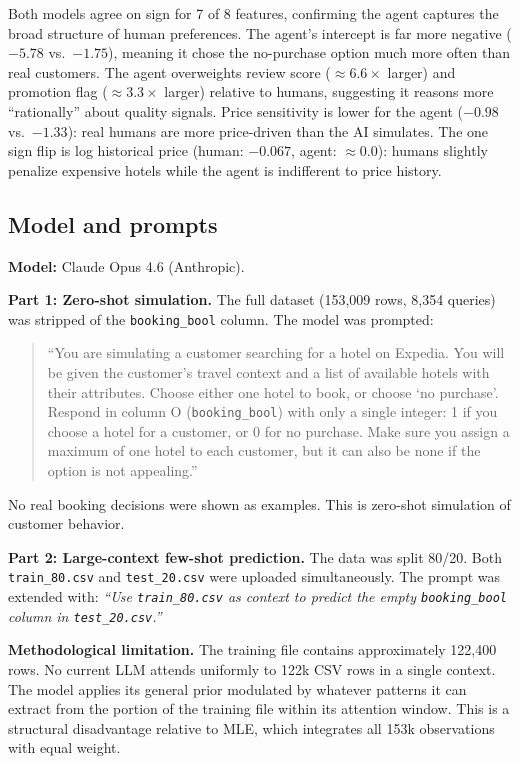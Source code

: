 \documentclass[11pt]{article}
\begin{document}
Both models agree on sign for 7 of 8 features, confirming the agent captures the broad structure of human preferences. The agent's intercept is far more negative ($-5.78$ vs.\ $-1.75$), meaning it chose the no-purchase option much more often than real customers. The agent overweights review score ($\approx 6.6\times$ larger) and promotion flag ($\approx 3.3\times$ larger) relative to humans, suggesting it reasons more ``rationally'' about quality signals. Price sensitivity is lower for the agent ($-0.98$ vs.\ $-1.33$): real humans are more price-driven than the AI simulates. The one sign flip is log historical price (human: $-0.067$, agent: $\approx 0.0$): humans slightly penalize expensive hotels while the agent is indifferent to price history.

\subsection*{Model and prompts}

\textbf{Model:} Claude Opus 4.6 (Anthropic).

\textbf{Part 1: Zero-shot simulation.} The full dataset (153,009 rows, 8,354 queries) was stripped of the \texttt{booking\_bool} column. The model was prompted:

\begin{quote}
``You are simulating a customer searching for a hotel on Expedia. You will be given the customer's travel context and a list of available hotels with their attributes. Choose either one hotel to book, or choose `no purchase'. Respond in column O (\texttt{booking\_bool}) with only a single integer: 1 if you choose a hotel for a customer, or 0 for no purchase. Make sure you assign a maximum of one hotel to each customer, but it can also be none if the option is not appealing.''
\end{quote}

No real booking decisions were shown as examples. This is zero-shot simulation of customer behavior.

\textbf{Part 2: Large-context few-shot prediction.} The data was split 80/20. Both \texttt{train\_80.csv} and \texttt{test\_20.csv} were uploaded simultaneously. The prompt was extended with: \textit{``Use \texttt{train\_80.csv} as context to predict the empty \texttt{booking\_bool} column in \texttt{test\_20.csv}.''}

\textbf{Methodological limitation.} The training file contains approximately 122,400 rows. No current LLM attends uniformly to 122k CSV rows in a single context. The model applies its general prior modulated by whatever patterns it can extract from the portion of the training file within its attention window. This is a structural disadvantage relative to MLE, which integrates all 153k observations with equal weight.
\end{document}
